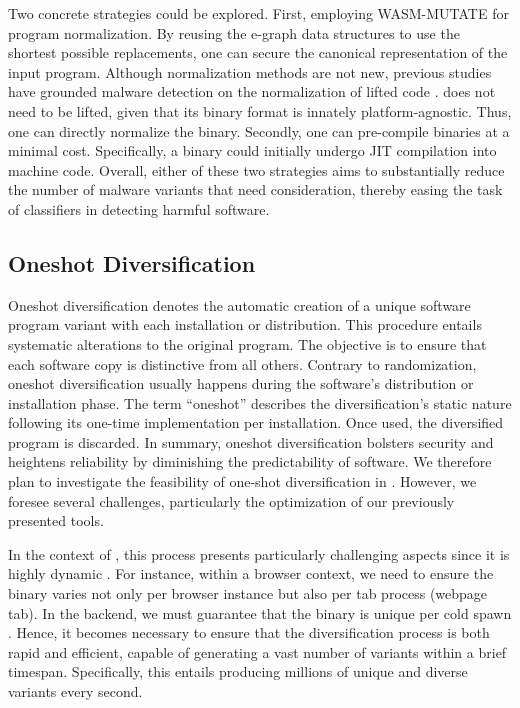 Two concrete strategies could be explored. 
First, employing WASM-MUTATE for program normalization. 
By reusing the e-graph data structures to use the shortest possible replacements, one can secure the canonical representation of the input program. 
Although normalization methods are not new, previous studies have grounded malware detection on the normalization of lifted code \cite{ 6234404, 10.1007/978-3-030-78120-0_5}. 
\Wasm does not need to be lifted, given that its binary format is innately platform-agnostic. 
Thus, one can directly normalize the \Wasm binary.
Secondly, one can pre-compile \Wasm binaries at a minimal cost. 
Specifically, a \Wasm binary could initially undergo JIT compilation into machine code. 
Overall, either of these two strategies aims to substantially reduce the number of malware variants that need consideration, thereby easing the task of classifiers in detecting harmful software. 



\vspace{-0.3cm}
\subsection{Oneshot Diversification}
Oneshot diversification denotes the automatic creation of a unique software program variant with each installation or distribution. 
This procedure entails systematic alterations to the original program. 
The objective is to ensure that each software copy is distinctive from all others. 
Contrary to randomization, oneshot diversification usually happens during the software's distribution or installation phase. 
The term ``oneshot'' describes the diversification's static nature following its one-time implementation per installation.
Once used, the diversified program is discarded. 
In summary, oneshot diversification bolsters security and heightens reliability by diminishing the predictability of software.
We therefore plan to investigate the feasibility of one-shot diversification in \Wasm. 
However, we foresee several challenges, particularly the optimization of our previously presented tools.


In the context of \Wasm, this process presents particularly challenging aspects since it is highly dynamic \cite{10034550}.
For instance, within a browser context, we need to ensure the \Wasm binary varies not only per browser instance but also per tab process (webpage tab).
In the backend, we must guarantee that the \Wasm binary is unique per cold spawn \cite{Sledge, Swivel}.
Hence, it becomes necessary to ensure that the diversification process is both rapid and efficient, capable of generating a vast number of variants within a brief timespan.
Specifically, this entails producing millions of unique and diverse variants every second.



